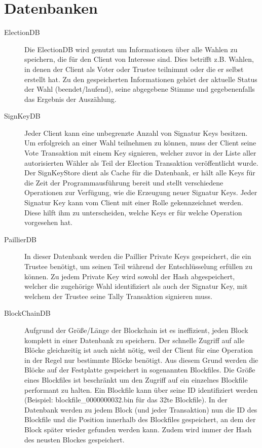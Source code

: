 \documentclass[colorback,accentcolor=tud1b]{tudreport}
\begin{document}
\section{Datenbanken}
\begin{description}
\item[ElectionDB] Die ElectionDB wird genutzt um Informationen über alle Wahlen zu speichern, die für den Client von Interesse sind. Dies betrifft z.B. Wahlen, in denen der Client als Voter oder Trustee teilnimmt oder die er selbst erstellt hat. Zu den gespeicherten Informationen gehört der aktuelle Status der Wahl (beendet/laufend), seine abgegebene Stimme und gegebenenfalls das Ergebnis der Auszählung.

\item[SignKeyDB] Jeder Client kann eine unbegrenzte Anzahl von Signatur Keys besitzen. Um erfolgreich an einer Wahl teilnehmen zu können, muss der Client seine Vote Transaktion mit einem Key signieren, welcher zuvor in der Liste aller autorisierten Wähler als Teil der Election Transaktion veröffentlicht wurde. Der SignKeyStore dient als Cache für die Datenbank, er hält alle Keys für die Zeit der Programmausführung bereit und stellt verschiedene Operationen zur Verfügung, wie die Erzeugung neuer Signatur Keys. Jeder Signatur Key kann vom Client mit einer Rolle gekennzeichnet werden. Diese hilft ihm zu unterscheiden, welche Keys er für welche Operation vorgesehen hat.

\item[PaillierDB] In dieser Datenbank werden die Paillier Private Keys gespeichert, die ein Trustee benötigt, um seinen Teil während der Entschlüsselung erfüllen zu können. Zu jedem Private Key wird sowohl der Hash abgespeichert, welcher die zugehörige Wahl identifiziert als auch der Signatur Key, mit welchem der Trustee seine Tally Transaktion signieren muss.

\item[BlockChainDB] Aufgrund der Größe/Länge der Blockchain ist es ineffizient, jeden Block komplett in einer Datenbank zu speichern. Der schnelle Zugriff auf alle Blöcke gleichzeitig ist auch nicht nötig, weil der Client für eine Operation in der Regel nur bestimmte Blöcke benötigt. Aus diesem Grund werden die Blöcke auf der Festplatte gespeichert in sogenannten Blockfiles. Die Größe eines Blockfiles ist beschränkt um den Zugriff auf ein einzelnes Blockfile performant zu halten. Ein Blockfile kann über seine ID identifiziert werden (Beispiel: blockfile\_0000000032.bin für das 32te Blockfile). In der Datenbank werden zu jedem Block (und jeder Transaktion) nun die ID des Blockfile und die Position innerhalb des Blockfiles gespeichert, an dem der Block später wieder gefunden werden kann. Zudem wird immer der Hash des neusten Blockes gespeichert.
\end{description}  
\end{document}
